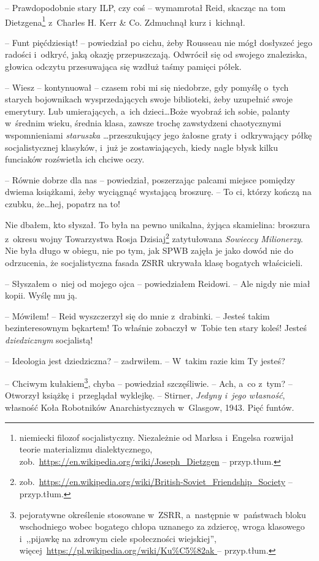 \documentclass[oneside,polish,11pt,sfheadings]{mwbk}
\begin{document}
-- Prawdopodobnie stary ILP, czy coś -- wymamrotał Reid, skacząc na tom Dietzgena\footnote{niemiecki filozof socjalistyczny.
Niezależnie od Marksa i~Engelsa rozwijał teorie materializmu
dialektycznego,
zob.~\url{https://en.wikipedia.org/wiki/Joseph_Dietzgen}  -- przyp.tłum.} z~Charles H. Kerr \& Co.  Zdmuchnął kurz i~kichnął.

-- Funt pięćdziesiąt! -- powiedział po cichu, żeby Rousseau nie mógł
dosłyszeć jego radości i~odkryć, jaką okazję przepuszczają. Odwrócił się
od swojego znaleziska, głowica odczytu przesuwająca się wzdłuż taśmy
pamięci półek.

-- Wiesz -- kontynuował -- czasem robi mi się niedobrze, gdy pomyślę o~tych
starych bojownikach wysprzedających swoje biblioteki, żeby uzupełnić
swoje emerytury. Lub umierających, a~ich dzieci\ldots Boże wyobraź ich
sobie, palanty w~średnim wieku, średnia klasa, zawsze trochę zawstydzeni
chaotycznymi wspomnieniami \emph{staruszka} \ldots przeszukujący jego
żałosne graty i~odkrywający półkę socjalistycznej klasyków, i~już je
zostawiających, kiedy nagle błysk kilku funciaków rozświetla ich chciwe
oczy.

-- Równie dobrze dla nas -- powiedział, poszerzając palcami miejsce
pomiędzy dwiema książkami, żeby wyciągnąć wystającą broszurę. -- To ci,
którzy kończą na czubku, że\ldots hej, popatrz na to!

Nie dbałem, kto słyszał. To była na pewno unikalna, żyjąca skamielina:
broszura z~okresu wojny Towarzystwa Rosja Dzisiaj\footnote{
zob.~\url{https://en.wikipedia.org/wiki/British-Soviet_Friendship_Society} -- przyp.tłum.} zatytułowana \emph{Sowieccy Milionerzy}. Nie była długo
w obiegu, nie po tym, jak SPWB zajęła je jako dowód nie do odrzucenia,
że socjalistyczna fasada ZSRR ukrywała klasę bogatych właścicieli.

-- Słyszałem o~niej od mojego ojca -- powiedziałem Reidowi. -- Ale nigdy
nie miał kopii. Wyślę mu ją.

-- Mówiłem! -- Reid wyszczerzył się do mnie z~drabinki. -- Jesteś takim
bezinteresownym bękartem! To właśnie zobaczył w~Tobie ten stary koleś!
Jesteś \emph{dziedzicznym} socjalistą!

-- Ideologia jest dziedziczna? -- zadrwiłem. -- W~takim razie kim Ty
jesteś?

-- Chciwym kułakiem\footnote{ pejoratywne określenie stosowane w~ZSRR, a~następnie w~państwach bloku wschodniego wobec bogatego chłopa uznanego
za zdziercę, wroga klasowego i~,,pijawkę na zdrowym ciele społeczności
wiejskiej'', więcej~\url{https://pl.wikipedia.org/wiki/Ku\%C5\%82ak } -- przyp.tłum.}, chyba -- powiedział szczęśliwie. -- Ach, a~co z~tym? -- Otworzył książkę i~przeglądał wyklejkę. -- Stirner, \emph{Jedyny i~jego
własność}, własność Koła Robotników Anarchistycznych w~Glasgow, 1943.
Pięć funtów.
\end{document}
